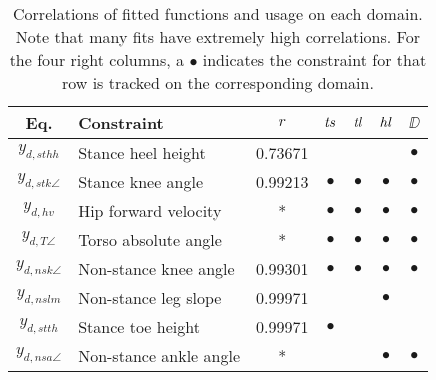 \begin{table*}[t!]
  \centering
  \caption[Correlations of fitted functions and usage on each
  domain.]{Correlations of fitted functions and usage on each domain.
    Note that many fits have extremely high correlations.
    For the four right columns, a $\bullet$ indicates the constraint for that
    row is tracked on the corresponding domain.
  }
  \begin{tabular}{| c | l | c || c | c | c | c |}
    \hline
        {\bf Eq.} & {\bf Constraint} & $r$ & $\mathit{ts}$ & $\mathit{tl}$ & $\mathit{hl}$ & $\DD$\\
        \hline
        $y_{d,sthh}$ & Stance heel height & 0.73671 & & & & $\bullet$ \\
        \hline
        $y_{d,stk\angle}$ & Stance knee angle & 0.99213 & $\bullet$ & $\bullet$
        & $\bullet$ & $\bullet$ \\
        \hline
        $y_{d,hv}$ & Hip forward velocity  & * & $\bullet$ & $\bullet$ &
        $\bullet$ & $\bullet$ \\
        \hline
        $y_{d,T\angle}$ & Torso absolute angle & * & $\bullet$ & $\bullet$ &
        $\bullet$ & $\bullet$ \\
        \hline
        $y_{d,nsk\angle}$ & Non-stance knee angle & 0.99301 & $\bullet$ &
        $\bullet$ & $\bullet$ & $\bullet$ \\
        \hline
        $y_{d,nslm}$ & Non-stance leg slope & 0.99971 & & & $\bullet$ & \\
        \hline
        $y_{d,stth}$ & Stance toe height & 0.99971 & $\bullet$ & & &\\
        \hline
        $y_{d,nsa\angle}$ & Non-stance ankle angle & * & & & $\bullet$ &
        $\bullet$\\
        \hline
  \end{tabular}
  \label{tab:fitcor}
\end{table*}
